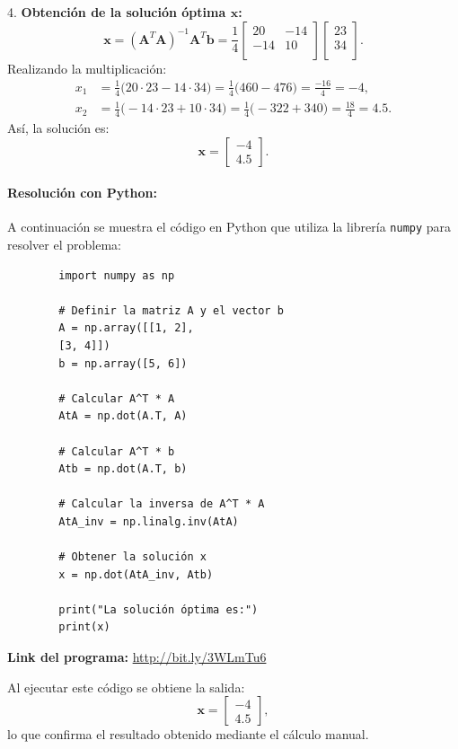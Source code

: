 \documentclass[12pt,a4,oneside]{book}
\begin{document}
	4. \textbf{Obtención de la solución óptima \(\mathbf{x}\):}
	\[
	\mathbf{x} = (\mathbf{A}^T \mathbf{A})^{-1}\mathbf{A}^T \mathbf{b} = \frac{1}{4} \begin{bmatrix}
		20 & -14 \\
		-14 & 10 \\
	\end{bmatrix} \begin{bmatrix}
		23 \\
		34 \\
	\end{bmatrix}.
	\]
	Realizando la multiplicación:
	\[
	\begin{aligned}
		x_1 &= \frac{1}{4}\Big(20\cdot23 - 14\cdot34\Big) = \frac{1}{4}\Big(460 - 476\Big) = \frac{-16}{4} = -4, \\
		x_2 &= \frac{1}{4}\Big(-14\cdot23 + 10\cdot34\Big) = \frac{1}{4}\Big(-322 + 340\Big) = \frac{18}{4} = 4.5.
	\end{aligned}
	\]
	Así, la solución es:
	\[
	\mathbf{x} = \begin{bmatrix} -4 \\ 4.5 \end{bmatrix}.
	\]
	
	\paragraph{Resolución con Python:}
	
	A continuación se muestra el código en Python que utiliza la librería \texttt{numpy} para resolver el problema:
	
	\begin{verbatim}
		import numpy as np
		
		# Definir la matriz A y el vector b
		A = np.array([[1, 2],
		[3, 4]])
		b = np.array([5, 6])
		
		# Calcular A^T * A
		AtA = np.dot(A.T, A)
		
		# Calcular A^T * b
		Atb = np.dot(A.T, b)
		
		# Calcular la inversa de A^T * A
		AtA_inv = np.linalg.inv(AtA)
		
		# Obtener la solución x
		x = np.dot(AtA_inv, Atb)
		
		print("La solución óptima es:")
		print(x)
	\end{verbatim}
	
	\textbf{Link del programa:} \url{http://bit.ly/3WLmTu6}
	
	Al ejecutar este código se obtiene la salida:
	\[
	\mathbf{x} = \begin{bmatrix} -4 \\ 4.5 \end{bmatrix},
	\]
	lo que confirma el resultado obtenido mediante el cálculo manual.
	
\end{document}
